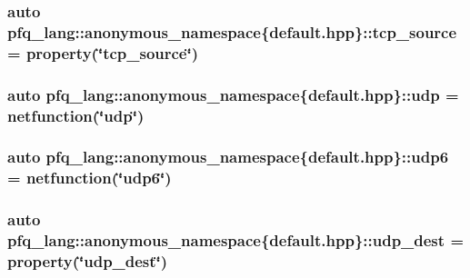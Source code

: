 \hypertarget{namespacepfq__lang_1_1anonymous__namespace_02default_8hpp_03_a4b3ea94407fb5f52e5dfd9e2511f04a8}{
\subsubsection[{tcp\-\_\-source}]{\setlength{\rightskip}{0pt plus 5cm}auto pfq\-\_\-lang\-::anonymous\-\_\-namespace\{default.\-hpp\}\-::tcp\-\_\-source = {\bf property}(\char`\"{}tcp\-\_\-source\char`\"{})}}\label{namespacepfq__lang_1_1anonymous__namespace_02default_8hpp_03_a4b3ea94407fb5f52e5dfd9e2511f04a8}
\hypertarget{namespacepfq__lang_1_1anonymous__namespace_02default_8hpp_03_a1f18de2040dd9d74a07b1c535911abdf}{
\subsubsection[{udp}]{\setlength{\rightskip}{0pt plus 5cm}auto pfq\-\_\-lang\-::anonymous\-\_\-namespace\{default.\-hpp\}\-::udp = {\bf netfunction}(\char`\"{}udp\char`\"{})}}\label{namespacepfq__lang_1_1anonymous__namespace_02default_8hpp_03_a1f18de2040dd9d74a07b1c535911abdf}
\hypertarget{namespacepfq__lang_1_1anonymous__namespace_02default_8hpp_03_a84b7a888d00d5dfea606f7df96ba0ad3}{
\subsubsection[{udp6}]{\setlength{\rightskip}{0pt plus 5cm}auto pfq\-\_\-lang\-::anonymous\-\_\-namespace\{default.\-hpp\}\-::udp6 = {\bf netfunction}(\char`\"{}udp6\char`\"{})}}\label{namespacepfq__lang_1_1anonymous__namespace_02default_8hpp_03_a84b7a888d00d5dfea606f7df96ba0ad3}
\hypertarget{namespacepfq__lang_1_1anonymous__namespace_02default_8hpp_03_a4f869214bea58f5ed42b3faded5ab088}{
\subsubsection[{udp\-\_\-dest}]{\setlength{\rightskip}{0pt plus 5cm}auto pfq\-\_\-lang\-::anonymous\-\_\-namespace\{default.\-hpp\}\-::udp\-\_\-dest = {\bf property}(\char`\"{}udp\-\_\-dest\char`\"{})}}\label{namespacepfq__lang_1_1anonymous__namespace_02default_8hpp_03_a4f869214bea58f5ed42b3faded5ab088}
